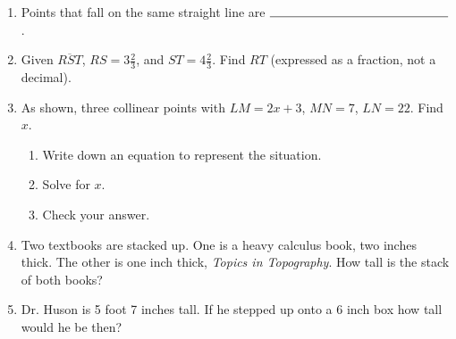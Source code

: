 \begin{enumerate}
\item Points that fall on the same straight line are $\rule{5cm}{0.15mm}$.

\newpage
\item Given $\overline{RST}$, $RS=3 \frac{2}{3}$, and $ST=4 \frac{2}{3}$. Find ${RT}$ (expressed as a fraction, not a decimal). \par \smallskip
{} \vspace{2cm}

\item As shown, three collinear points with $LM=2x+3$, $MN=7$, $LN=22$. Find ${x}$. \vspace{1cm}
    \begin{center}
    \end{center}
  \begin{enumerate}
    \item Write down an equation to represent the situation. \vspace{0.5cm}
    \item Solve for $x$. \vspace{2.5cm}
    \item Check your answer. \vspace{2cm}
  \end{enumerate}

\item Two textbooks are stacked up. One is a heavy calculus book, two inches thick. The other is one inch thick, \emph{Topics in Topography}. How tall is the stack of both books? \vspace{3cm}

\item Dr. Huson is 5 foot 7 inches tall. If he stepped up onto a 6 inch box how tall would he be then?

  
\end{enumerate}
